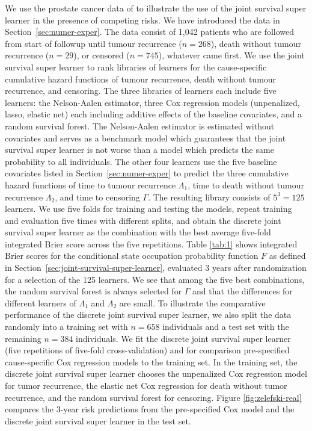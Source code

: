 \documentclass[a4paper,danish]{article}
\newcommand{\1}{\mathds{1}}
\theoremstyle{plain} %
\numberwithin{theorem}{section}
\theoremstyle{definition} %
\theoremstyle{remark}
\begin{document}
We use the prostate cancer data of \cite{kattan2000pretreatment} to
illustrate the use of the joint survival super learner in the presence
of competing risks. We have introduced the data in
Section~\ref{sec:numer-exper}. The data consist of 1,042 patients who
are followed from start of followup until tumour recurrence ($n=268$),
death without tumour recurrence ($n=29$), or censored ($n=745$),
whatever came first. We use the joint survival super learner to rank
libraries of learners for the cause-specific cumulative hazard
functions of tumour recurrence, death without tumour recurrence, and
censoring. The three libraries of learners each include five learners:
the Nelson-Aalen estimator, three Cox regression models (unpenalized,
lasso, elastic net) each including additive effects of the baseline
covariates, and a random survival forest. The Nelson-Aalen estimator
is estimated without covariates and serves as a benchmark model which
guarantees that the joint survival super learner is not worse than a
model which predicts the same probability to all individuals. The
other four learners use the five baseline covariates listed in
Section~\ref{sec:numer-exper} to predict the three cumulative hazard
functions of time to tumour recurrence \( \Lambda_1 \), time to death
without tumour recurrence \( \Lambda_2 \), and time to censoring
$\Gamma$. The resulting library consists of \( 5^3 = 125 \)
learners. We use five folds for training and testing the models,
repeat training and evaluation five times with different splits, and
obtain the discrete joint survival super learner as the combination
with the best average five-fold integrated Brier score across the five
repetitions. Table \ref{tab:1} shows integrated Brier scores for the
conditional state occupation probability function \( F \) as defined
in Section~\ref{sec:joint-survival-super-learner}, evaluated 3 years
after randomization for a selection of the 125 learners. We see that
among the five best combinations, the random survival forest is always
selected for \(\Gamma\) and that the differences for different
learners of \(\Lambda_1\) and \(\Lambda_2\) are small. To illustrate
the comparative performance of the discrete joint survival super
learner, we also split the data randomly into a training set with
\(n=658\) individuals and a test set with the remaining \(n=384\)
individuals.  We fit the discrete joint survival super learner (five
repetitions of five-fold cross-validation) and for comparison
pre-specified cause-specific Cox regression models to the training
set. In the training set, the discrete joint survival super learner
chooses the unpenalized Cox regression model for tumor recurrence, the
elastic net Cox regression for death without tumor recurrence, and the
random survival forest for censoring. Figure \ref{fig:zelefski-real}
compares the 3-year risk predictions from the pre-specified Cox model
and the discrete joint survival super learner in the test set.
\end{document}
